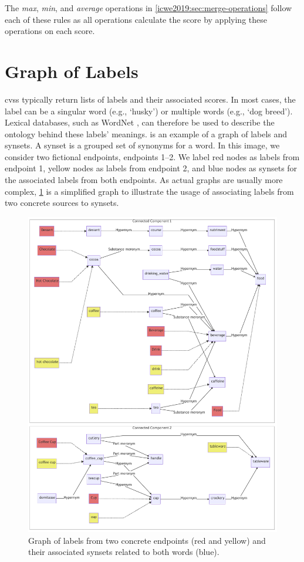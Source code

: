 The \textit{max}, \textit{min}, and \textit{average} operations in \cref{icwe2019:sec:merge-operations} follow each of these rules as all operations calculate the score by applying these operations on each score.

\section{Graph of Labels}\label{icwe2019:sec:graph-of-labels}

\Glspl{cvs} typically return lists of labels and their associated scores. In most cases, the label can be a singular word (e.g., `husky') or multiple words (e.g., `dog breed'). Lexical databases, such as WordNet \citep{WordNetMiller1995}, can therefore be used to describe the ontology behind these labels' meanings.
 is an example of a graph of labels and synsets.
A synset is a grouped set of synonyms for a word.
In this image, we consider two fictional endpoints, endpoints 1--2. We label red nodes as labels from endpoint 1, yellow nodes as labels from endpoint 2, and blue nodes as synsets for the associated labels from both endpoints.
As actual graphs are usually more complex, \cref{icwe2019:fig:labels-graph} is a simplified graph to illustrate the usage of associating labels from two concrete sources to synsets.

\begin{figure}
\centering\includegraphics[width=\linewidth]{mermaid_coffee}
\caption[Graph of associated synsets against two different endpoints]{Graph of labels from two concrete endpoints (red and yellow) and their associated synsets related to both words (blue).}\label{icwe2019:fig:labels-graph}
\end{figure}

